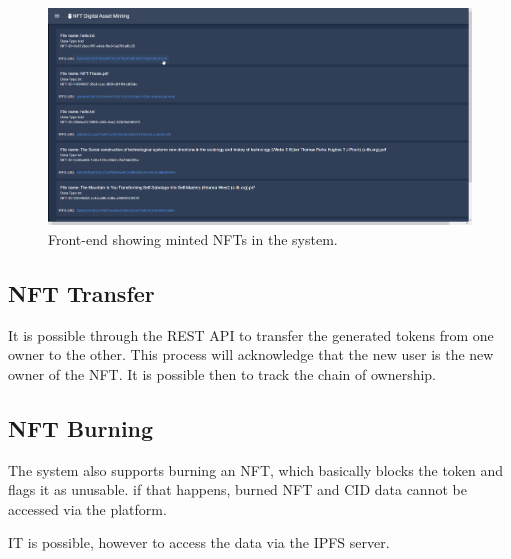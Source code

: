  \begin{figure}[!h]
        \centering
        \includegraphics[width=15cm]{img/SystemList.png}
        \caption{Front-end showing minted \ac{NFT}s in the system.}
        \label{fig:UI_MintTokens}
    \end{figure}
    
\subsection{NFT Transfer}
It is possible through the \ac{REST} \ac{API} to transfer the generated tokens from one owner to the other. This process will acknowledge that the new user is the new owner of the \ac{NFT}. It is possible then to track the chain of ownership.

\subsection{NFT Burning}
The system also supports burning an \ac{NFT}, which basically blocks the token and flags it as unusable. if that happens, burned \ac{NFT} and \ac{CID} data cannot be accessed via the platform.

IT is possible, however to access the data via the \ac{IPFS} server.